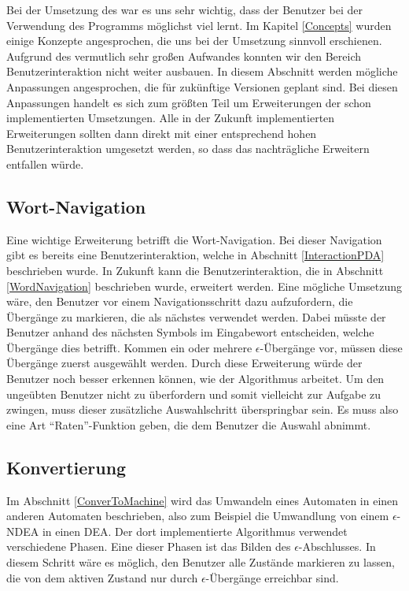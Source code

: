 Bei der Umsetzung des \gtitools war es uns sehr wichtig, dass der Benutzer bei
der Verwendung des Programms möglichst viel lernt. Im Kapitel \ref{Concepts}
wurden einige Konzepte angesprochen, die uns bei der Umsetzung sinnvoll
erschienen. Aufgrund des vermutlich sehr großen Aufwandes konnten wir den Bereich
Benutzerinteraktion nicht weiter ausbauen. In diesem Abschnitt werden mögliche
Anpassungen angesprochen, die für zukünftige \gtitool Versionen geplant sind. Bei
diesen Anpassungen handelt es sich zum größten Teil um Erweiterungen der schon
implementierten Umsetzungen. Alle in der Zukunft implementierten Erweiterungen
sollten dann direkt mit einer entsprechend hohen Benutzerinteraktion umgesetzt
werden, so dass das nachträgliche Erweitern entfallen würde.\vspace{10pt}


\subsection{Wort-Navigation}\label{PerspectiveWordNavigation}
Eine wichtige Erweiterung betrifft die Wort-Navigation. Bei dieser Navigation
gibt es bereits eine Benutzerinteraktion, welche in Abschnitt
\ref{InteractionPDA} beschrieben wurde. In Zukunft kann die Benutzerinteraktion,
die in Abschnitt \ref{WordNavigation} beschrieben wurde, erweitert werden. Eine
mögliche Umsetzung wäre, den Benutzer vor einem Navigationsschritt dazu
aufzufordern, die Übergänge zu markieren, die als nächstes verwendet werden.
Dabei müsste der Benutzer anhand des nächsten Symbols im Eingabewort entscheiden,
welche Übergänge dies betrifft. Kommen ein oder mehrere $\epsilon$-Übergänge vor,
müssen diese Übergänge zuerst ausgewählt werden. Durch diese Erweiterung würde
der Benutzer noch besser erkennen können, wie der Algorithmus arbeitet. Um den
ungeübten Benutzer nicht zu überfordern und somit vielleicht zur Aufgabe zu
zwingen, muss dieser zusätzliche Auswahlschritt überspringbar sein. Es muss also
eine Art "`Raten"'-Funktion geben, die dem Benutzer die Auswahl
abnimmt.\vspace{10pt}


\subsection{Konvertierung}\label{PerspectiveConvertTo}
Im Abschnitt \ref{ConverToMachine} wird das Umwandeln eines Automaten in einen
anderen Automaten beschrieben, also zum Beispiel die Umwandlung von einem
$\epsilon$-NDEA in einen DEA. Der dort implementierte Algorithmus verwendet
verschiedene Phasen. Eine dieser Phasen ist das Bilden des
$\epsilon$-Abschlusses. In diesem Schritt wäre es möglich, den Benutzer alle
Zustände markieren zu lassen, die von dem aktiven Zustand nur durch
$\epsilon$-Übergänge erreichbar sind.\vspace{10pt}

